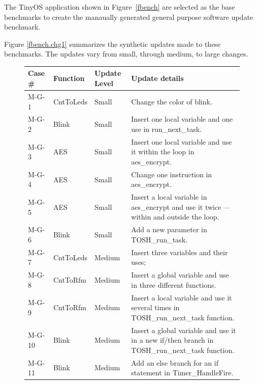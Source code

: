 The TinyOS application shown in Figure~\ref{fbench} are selected as the base benchmarks
to create the manaually generated general purpose software update benchmark.


Figure \ref{fbench.chg1} summarizes the synthetic updates made to these
benchmarks. The updates vary from small, through medium, to large changes.

\begin{figure}[htbp]
\centering
\begin{small}
\begin{tabular}{||p{0.6in}|p{1in}|p{0.5in}|p{3.5in}||} \hline
Case \# & Function & Update Level & Update details \\ \hline \hline

M-G-1 & CntToLeds &Small & Change the color of blink. \\ \hline

M-G-2 & Blink &Small & Insert one local variable and one use in
run\_next\_task. \\ \hline

M-G-3 & AES& Small & Insert one local variable and use it within the
loop in aes\_encrypt. \\ \hline

M-G-4 & AES & Small & Change one instruction in aes\_encrypt. \\ \hline

M-G-5 & AES & Small & Insert a local variable in aes\_encrypt and use it
twice --- within and outside the loop. \\ \hline

M-G-6 & Blink &Small &Add a new parameter in TOSH\_run\_task. \\ \hline

M-G-7 & CntToLeds & Medium & Insert three variables and their uses; \\
\hline

M-G-8 & CntToRfm & Medium & Insert a global variable and use in three
different functions. \\ \hline

M-G-9 & CntToRfm & Medium & Insert a local variable and use it several
times in TOSH\_run\_next\_task function. \\ \hline

M-G-10 & Blink&Medium & Insert a global variable and use it in a new
if/then branch in TOSH\_run\_next\_task function. \\ \hline

M-G-11 & Blink & Medium & Add an else branch for an if statement in Timer\_HandleFire. \\ \hline


\end{tabular}
\end{small}
\end{figure}

